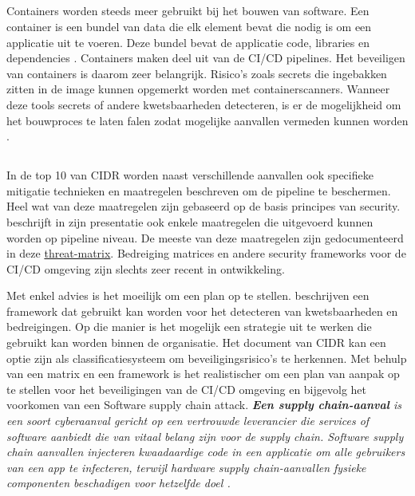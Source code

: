 \subsection{}%
\label{sec:Beheer van secrets in containers}
Containers worden steeds meer gebruikt bij het bouwen van software. Een container is een bundel van data die elk element bevat die nodig is om een applicatie uit te voeren. Deze bundel bevat de applicatie code, libraries en dependencies \autocite{Levine2020}. Containers maken deel uit van de CI/CD pipelines. Het beveiligen van containers is daarom zeer belangrijk. Risico's zoals secrets die ingebakken zitten in de image kunnen opgemerkt worden met containerscanners. Wanneer deze tools secrets of andere kwetsbaarheden detecteren, is er de mogelijkheid om het bouwproces te laten falen zodat mogelijke aanvallen vermeden kunnen worden \autocite{Agarwal2021}. 


\subsection{}%
\label{sec:Beheer van de pipeline en opstellen van security raamwerken aan de hand van een bedreigingsmatrix}
In de top 10 van CIDR \textcite{Security2022} worden naast verschillende aanvallen ook specifieke mitigatie technieken en maatregelen beschreven om de pipeline te beschermen. Heel wat van deze maatregelen zijn gebaseerd op de basis principes van security. \textcite{Suezawa2021} beschrijft in zijn presentatie ook enkele maatregelen die uitgevoerd kunnen worden op pipeline niveau. De meeste van deze maatregelen zijn gedocumenteerd in deze \href{https://github.com/rung/threat-matrix-cicd}{threat-matrix}. Bedreiging matrices en andere security frameworks voor de CI/CD omgeving zijn slechts zeer recent in ontwikkeling.
\clearpage


Met enkel advies is het moeilijk om een plan op te stellen. \autocite{Koopman2019AFF} beschrijven een framework dat gebruikt kan worden voor het detecteren van kwetsbaarheden en bedreigingen. Op die manier is het mogelijk een strategie uit te werken die gebruikt kan worden binnen de organisatie. Het document van CIDR \textcite{Security2022} kan een optie zijn als classificatiesysteem om beveiligingsrisico's te herkennen. Met behulp van een matrix en een framework is het realistischer om een plan van aanpak op te stellen voor het beveiligingen van de CI/CD omgeving en bijgevolg het voorkomen van een Software supply chain attack. \textit{\textbf{Een supply chain-aanval} is een soort cyberaanval gericht op een vertrouwde leverancier die services of software aanbiedt die van vitaal belang zijn voor de supply chain. Software supply chain aanvallen injecteren kwaadaardige code in een applicatie om alle gebruikers van een app te infecteren, terwijl hardware supply chain-aanvallen fysieke componenten beschadigen voor hetzelfde doel \autocite{Koopman2019AFF}.}
\newline

